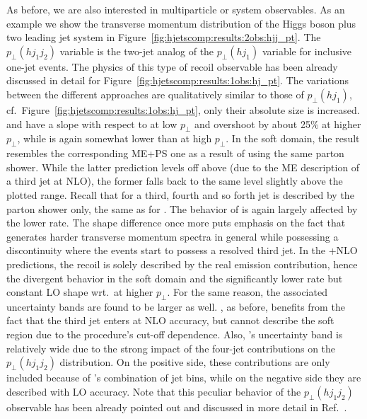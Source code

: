 As before, we are also interested in multiparticle or system
observables. As an example we show the transverse momentum
distribution of the Higgs boson plus two leading jet system in
Figure~\ref{fig:hjetscomp:results:2obs:hjj_pt}. The $p_\perp(hj_1j_2)$
variable is the two-jet analog of the $p_\perp(hj_1)$ variable for
inclusive one-jet events. The physics of this type of recoil
observable has been already discussed in detail for 
Figure~\ref{fig:hjetscomp:results:1obs:hj_pt}. The variations between 
the different approaches are qualitatively similar to those of 
$p_\perp(hj_1)$, cf.\ Figure~\ref{fig:hjetscomp:results:1obs:hj_pt}, 
only their absolute size is increased. \MGaMC and \Sherpa have a slope with respect
to \Powheg at low $p_\perp$ and overshoot by about 25\% at higher
$p_\perp$, while \Herwig is again somewhat lower than \Powheg at high
$p_\perp$. In the soft domain, the \Sherpa \NNLOPS result resembles
the corresponding ME+PS one as a result of using the same parton
shower. While the latter prediction levels off above \Powheg (due to
the ME description of a third jet at NLO), the former falls back to
the same level slightly above the plotted range. Recall that for 
\Sherpa \NNLOPS a third, fourth and so
forth jet is described by the parton shower only, the same as for \Powheg.
The behavior of \Hej is again largely affected by the lower rate. The
shape difference once more puts emphasis on the fact that \Hej
generates harder transverse momentum spectra in general while possessing 
a discontinuity where the events start to possess a resolved third jet. 
In the \GoSam{}+\Sherpa NLO predictions, the recoil is solely
described by the real emission contribution, hence the divergent
behavior in the soft domain and the significantly lower rate but
constant LO shape wrt.~\Powheg at higher $p_\perp$. For the same
reason, the associated uncertainty bands are found to be larger as
well. \Loopsim, as before, benefits from the fact that the third
jet enters at NLO accuracy, but cannot describe the soft region due to
the procedure's cut-off dependence. Also, \Loopsim's uncertainty band
is relatively wide due to the strong impact of the four-jet
contributions on the $p_\perp(hj_1j_2)$ distribution. On the positive
side, these contributions are only included because of \Loopsim's
combination of jet bins, while on the negative side they are described
with  LO accuracy. Note that this peculiar behavior of the
$p_\perp(hj_1j_2)$ observable has been already pointed out and
discussed in more detail in Ref.~\cite{Greiner:2015jha}.


